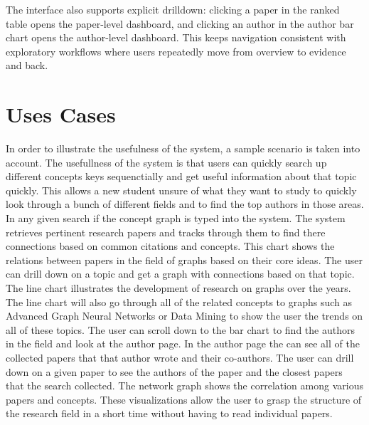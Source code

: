 \documentclass[sigconf]{acmart}
\begin{document}
The interface also supports explicit drilldown: clicking a paper in the ranked table opens the paper-level dashboard, and clicking an author in the author bar chart opens the author-level dashboard. This keeps navigation consistent with exploratory workflows where users repeatedly move from overview to evidence and back.




\section{Uses Cases}
In order to illustrate the usefulness of the system, a sample scenario is taken into account. The usefullness of the system is that users can quickly search up different concepts keys sequenctially and get useful information about that topic quickly. This allows a new student unsure of what they want to study to quickly look through a bunch of different fields and to find the top authors in those areas. In any given search if the concept graph is typed into the system. The system retrieves pertinent research papers and tracks through them to find there connections based on common citations and concepts. This chart shows the relations between papers in the field of graphs based on their core ideas. The user can drill down on a topic and get a graph with connections based on that topic.  The line chart illustrates the development of research on graphs over the years. The line chart will also go through all of the related concepts to graphs such as Advanced Graph Neural Networks or Data Mining to show the user the trends on all of these topics. The user can scroll down to the bar chart to find the authors in the field and look at the author page. In the author page the can see all of the collected papers that that author wrote and their co-authors. The user can drill down on a given paper to see the authors of the paper and the closest papers that the search collected.  The network graph shows the correlation among various papers and concepts. These visualizations allow the user to grasp the structure of the research field in a short time without having to read individual papers.
\end{document}
